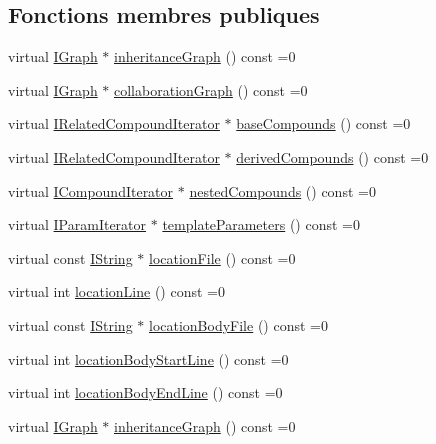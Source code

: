 \subsection*{Fonctions membres publiques}
\begin{DoxyCompactItemize}
\item 
virtual \hyperlink{class_i_graph}{I\+Graph} $\ast$ \hyperlink{class_i_class_ac40335240bb831822abd5a78b93cd18c}{inheritance\+Graph} () const  =0
\item 
virtual \hyperlink{class_i_graph}{I\+Graph} $\ast$ \hyperlink{class_i_class_a9a4868aa1725ff40c25df37a61236db1}{collaboration\+Graph} () const  =0
\item 
virtual \hyperlink{class_i_related_compound_iterator}{I\+Related\+Compound\+Iterator} $\ast$ \hyperlink{class_i_class_a465dcb947012a4cf59cde116115bc555}{base\+Compounds} () const  =0
\item 
virtual \hyperlink{class_i_related_compound_iterator}{I\+Related\+Compound\+Iterator} $\ast$ \hyperlink{class_i_class_afa3794f4cf39dd6bf27b4ca76e23c377}{derived\+Compounds} () const  =0
\item 
virtual \hyperlink{class_i_compound_iterator}{I\+Compound\+Iterator} $\ast$ \hyperlink{class_i_class_a12ee5cafae5e1f824873fccc2557d459}{nested\+Compounds} () const  =0
\item 
virtual \hyperlink{class_i_param_iterator}{I\+Param\+Iterator} $\ast$ \hyperlink{class_i_class_a14c81b112428058413984710bd3427dc}{template\+Parameters} () const  =0
\item 
virtual const \hyperlink{class_i_string}{I\+String} $\ast$ \hyperlink{class_i_class_a0a90ef5e6c12fc733c5ee48a2bc492a3}{location\+File} () const  =0
\item 
virtual int \hyperlink{class_i_class_a464256b65645ff2f66c709f12352ade9}{location\+Line} () const  =0
\item 
virtual const \hyperlink{class_i_string}{I\+String} $\ast$ \hyperlink{class_i_class_aa942dacee208e9e852ef8071c6e913ba}{location\+Body\+File} () const  =0
\item 
virtual int \hyperlink{class_i_class_a8a18f4c67d2e9ec0fb4574f1ca7dfc42}{location\+Body\+Start\+Line} () const  =0
\item 
virtual int \hyperlink{class_i_class_a1d79134da2a3b490b205037ff677084e}{location\+Body\+End\+Line} () const  =0
\item 
virtual \hyperlink{class_i_graph}{I\+Graph} $\ast$ \hyperlink{class_i_class_ac40335240bb831822abd5a78b93cd18c}{inheritance\+Graph} () const  =0
\item 

\end{DoxyCompactItemize}
